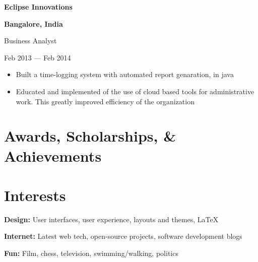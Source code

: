 \documentclass[11pt, letterpaper]{article}
\def\trim#1{\ignorespaces#1\unskip}
\newcommand{\itemtitle}[2]
{ %
  \begin{minipage}[b]{0.7\hsize}
    \begin{flushleft}
      \bfseries
      \trim{#1}
    \end{flushleft}
  \end{minipage}
  \hfill
  \begin{minipage}[b]{0.3\hsize}
    \begin{flushright}
      \bfseries
      \trim{#2}
    \end{flushright}
  \end{minipage}
  \vspace{0.3em}
}
\newcommand{\itemdetail}[2]
{ %
  \begin{minipage}[b]{0.7\hsize}
    \begin{flushleft}
      \trim{#1}
    \end{flushleft}
  \end{minipage}
  \hfill
  \begin{minipage}[b]{0.3\hsize}
    \begin{flushright}
      \trim{#2}
    \end{flushright}
  \end{minipage}
  \vspace{-1em}
}
\begin{document}
\itemtitle{ Eclipse Innovations }{ Bangalore, India }
\itemdetail{ Business Analyst }{ Feb 2013 --- Feb 2014 }
\begin{itemize}
  \item Built a time-logging system with automated report genaration, in java
  \item Educated and implemented of the use of cloud based tools for administrative work. This greatly improved efficiency of the organization
\end{itemize}


\section*{Awards, Scholarships, \& Achievements}

\itemtitle{  }{  }
\itemdetail{  }{  }


\section*{Interests}

\textbf{\trim{ Design: }} User interfaces, user experience, layouts and themes, \LaTeX\

\textbf{\trim{ Internet: }} Latest web tech, open-source projects, software development blogs

\textbf{\trim{ Fun: }} Film, chess, television, swimming/walking, politics
\end{document}
